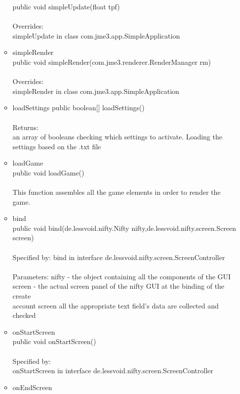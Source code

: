 \documentclass[letterpaper]{article}
\begin{document}
\begin{itemize}
\begin{itemize}
										public void simpleUpdate(float tpf) \\ \\
										Overrides: \\
										simpleUpdate in class com.jme3.app.SimpleApplication
								\item	simpleRender \\
										public void simpleRender(com.jme3.renderer.RenderManager rm) \\ \\
										Overrides: \\
										simpleRender in class com.jme3.app.SimpleApplication
								\item	loadSettings
										public boolean[] loadSettings() \\ \\
										Returns: \\
										an array of booleans checking which settings to activate. Loading the settings based on the .txt file
								\item	loadGame \\
										public void loadGame() \\ \\
										This function assembles all the game elements in order to render the game.
								\item	bind \\
										public void bind(de.lessvoid.nifty.Nifty nifty,de.lessvoid.nifty.screen.Screen screen) \\ \\
										Specified by:
										bind in interface de.lessvoid.nifty.screen.ScreenController \\ \\
										Parameters:
										nifty - the object containing all the components of the GUI \\
										screen - the actual screen panel of the nifty GUI at the binding of the create \\ account screen all the appropriate text field's data are collected and checked
								\item	onStartScreen \\
										public void onStartScreen() \\ \\
										Specified by: \\
										onStartScreen in interface de.lessvoid.nifty.screen.ScreenController
								\item	onEndScreen \\

\end{itemize}
\end{itemize}
\end{document}
